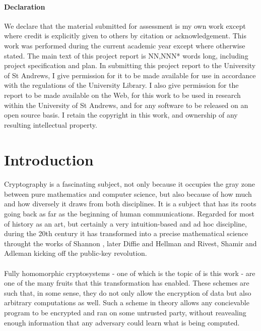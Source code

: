 \documentclass{article}
\theoremstyle{definition}
\theoremstyle{example}
\begin{document}
\paragraph{Declaration}
We declare that the material submitted for assessment is my own work except where credit is explicitly given to others by citation or acknowledgement. This work was performed during the current academic year except where otherwise stated. The main text of this project report is NN,NNN* words long, including project specification and plan. In submitting this project report to the University of St Andrews, I give permission for it to be made available for use in accordance with the regulations of the University Library. I also give permission for the report to be made available on the Web, for this work to be used in research within the University of St Andrews, and for any software to be released on an open source basis. I retain the copyright in this work, and ownership of any resulting intellectual property.

\newpage

\tableofcontents

\newpage


\section{Introduction}
\paragraph{}
Cryptography is a fascinating subject, not only because it occupies the gray
zone between pure mathematics and computer science, but also because of how much
and how diversely it draws from both disciplines. It is a subject that has its
roots going back as far as the beginning of human communications. Regarded
for most of history as an art, but certainly a very intuition-based and ad hoc
discipline, during the 20th century it has transformed into a precise mathematical
science throught the works of Shannon \cite{shannon1949communication}, later Diffie and Hellman
\cite{diffie1976new} and Rivest, Shamir and Adleman \cite{rivest1978method}
kicking off the public-key revolution.
\paragraph{}
Fully homomorphic cryptosystems - one of which is the topic of is this work - are one
of the many fruits that this transformation has enabled. These schemes are such
that, in some sense, they do not only allow the encryption of data but also
arbitrary computations as well. Such a scheme in theory allows any concievable
program to be encrypted and ran on some untrusted party, without reavealing
enough information that any adversary could learn what is being computed.
\end{document}
